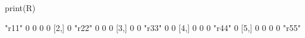 \begin{Schunk}
\begin{Sinput}
 print(R)
\end{Sinput}
\begin{Soutput}
     [,1]  [,2]  [,3]  [,4]  [,5] 
[1,] "r11" 0     0     0     0    
[2,] 0     "r22" 0     0     0    
[3,] 0     0     "r33" 0     0    
[4,] 0     0     0     "r44" 0    
[5,] 0     0     0     0     "r55"
\end{Soutput}
\end{Schunk}
